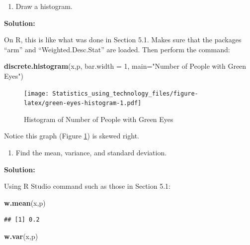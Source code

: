 \documentclass[
]{book}
\newenvironment{Shaded}{\begin{snugshade}}{\end{snugshade}}
\newcommand{\DataTypeTok}[1]{\textcolor[rgb]{0.13,0.29,0.53}{#1}}
\newcommand{\DecValTok}[1]{\textcolor[rgb]{0.00,0.00,0.81}{#1}}
\newcommand{\KeywordTok}[1]{\textcolor[rgb]{0.13,0.29,0.53}{\textbf{#1}}}
\newcommand{\NormalTok}[1]{#1}
\newcommand{\StringTok}[1]{\textcolor[rgb]{0.31,0.60,0.02}{#1}}
\providecommand{\tightlist}{%
  \setlength{\itemsep}{0pt}\setlength{\parskip}{0pt}}
\begin{document}
\begin{enumerate}
\def\labelenumi{\alph{enumi}.}
\setcounter{enumi}{2}
\tightlist
\item
  Draw a histogram.
\end{enumerate}

\textbf{Solution:}

On R, this is like what was done in Section 5.1. Makes sure that the packages ``arm'' and ``Weighted.Desc.Stat'' are loaded. Then perform the command:



\begin{Shaded}
\begin{Highlighting}[]
\KeywordTok{discrete.histogram}\NormalTok{(x,p, }\DataTypeTok{bar.width =} \DecValTok{1}\NormalTok{, }\DataTypeTok{main=}\StringTok{"Number of People with Green Eyes"}\NormalTok{)}
\end{Highlighting}
\end{Shaded}

\begin{figure}
\centering
\texttt{[image: Statistics\_using\_technology\_files/figure-latex/green-eyes-histogram-1.pdf]}
\caption{\label{fig:green-eyes-histogram}Histogram of Number of People with Green Eyes}
\end{figure}

Notice this graph (Figure \ref{fig:green-eyes-histogram}) is skewed right.

\begin{enumerate}
\def\labelenumi{\alph{enumi}.}
\setcounter{enumi}{3}
\tightlist
\item
  Find the mean, variance, and standard deviation.
\end{enumerate}

\textbf{Solution:}

Using R Studio command such as those in Section 5.1:

\begin{Shaded}
\begin{Highlighting}[]
\KeywordTok{w.mean}\NormalTok{(x,p)}
\end{Highlighting}
\end{Shaded}

\begin{verbatim}
## [1] 0.2
\end{verbatim}

\begin{Shaded}
\begin{Highlighting}[]
\KeywordTok{w.var}\NormalTok{(x,p)}
\end{Highlighting}
\end{Shaded}
\end{document}
